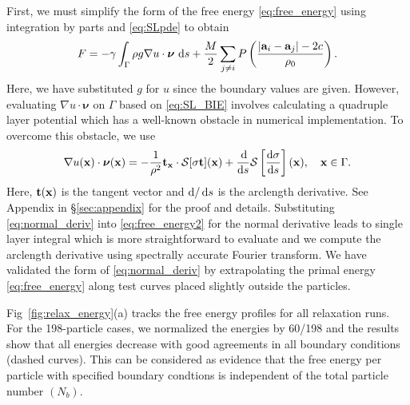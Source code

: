 \documentclass[prb,preprint,showpacs,preprintnumbers,amsmath,amssymb,longbibliography]{revtex4-1}
\renewcommand{\aa}{\mathbf{a}}
\newcommand{\DD}{\mathcal{D}}
\newcommand{\SSS}{\mathcal{S}}
\newcommand{\nnu}{\boldsymbol{\nu}}
\newcommand{\xx}{\mathbf{x}}
\begin{document}
First, we must simplify the form of the free energy
\eqref{eq:free_energy} using integration by parts and \eqref{eq:SLpde}
to obtain
\begin{equation}
\label{eq:free_energy2}
F = -\gamma
\int_{\Gamma} \rho g \nabla u \cdot \nnu \,\dif s
+ \frac{M}{2}
\sum_{j \neq i} 
P\left(\frac{|\aa_i - \aa_j|-2c}{\rho_0}\right).
\end{equation}
%
Here, we have substituted $g$ for $u$ since the boundary values are given.
However, evaluating $\nabla u \cdot \nnu$ on $\Gamma$ based on \eqref{eq:SL_BIE}
involves calculating a quadruple layer potential which has a
well-known obstacle in numerical implementation.
To overcome this obstacle, we use
%
\begin{equation}
\label{eq:normal_deriv}
\nabla u(\xx) \cdot \nnu(\xx)=
-\frac{1}{\rho^2} {\bf t}_\xx\cdot \SSS[\sigma{\bf t}](\xx)
+ \frac{\dif}{\dif s}\SSS\left[\frac{\dif \sigma}{\dif s}\right](\xx), \quad \xx \in \Gamma.
\end{equation}
%
Here, ${\bf t}(\xx)$ is the tangent vector and $\dif/\dif s$ is the arclength derivative.
See Appendix in \S\ref{sec:appendix} for the proof and details.
Substituting \eqref{eq:normal_deriv} into \eqref{eq:free_energy2} for the normal derivative
leads to single layer integral which is more straightforward to evaluate and we compute the
arclength derivative using spectrally accurate Fourier transform.
We have validated the form of \eqref{eq:normal_deriv} by extrapolating 
the primal energy \eqref{eq:free_energy} along test curves placed slightly
outside the particles. 

Fig~\ref{fig:relax_energy}(a) tracks the free energy profiles for all relaxation runs.
For the 198-particle cases, we normalized the energies by 60/198 and the results
show that all energies decrease with good agreements in all boundary conditions (dashed curves).
This can be considered as evidence that the free energy per particle with specified
boundary condtions is independent of the total particle number $(N_b)$.
\end{document}
